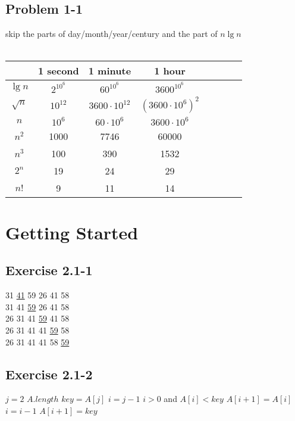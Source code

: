 \documentclass[12pt]{article}
\theoremstyle{definition}
\theoremstyle{remark}
\begin{document}
\subsection*{Problem 1-1}
skip the parts of day/month/year/century and the part of $n\lg{n}$\\
\\
\begin{tabular}{|c|c|c|c|c|c|c|c|}\hline
 & 1 second & 1 minute & 1 hour\\ \hline
$\lg{n}$ & $2^{10^6}$ & $60^{10^6}$ & $3600^{10^6}$\\ \hline
$\sqrt{n}$ & $10^{12}$ & $3600\cdot 10^{12}$ & $(3600\cdot 10^6)^2$\\ \hline
$n$ & $10^6$ & $60\cdot 10^6$ & $3600\cdot 10^6$ \\ \hline
$n^2$ & 1000 & 7746 & 60000 \\ \hline
$n^3$ & 100 & 390 & 1532 \\ \hline
$2^n$ & 19 & 24 & 29 \\ \hline
$n!$ & 9 & 11 & 14 \\ \hline
\end{tabular}
\section{Getting Started}
\subsection*{Exercise 2.1-1}
31 \underline{41} 59 26 41 58\\
31 41 \underline{59} 26 41 58\\
26 31 41 \underline{59} 41 58\\
26 31 41 41 \underline{59} 58\\
26 31 41 41 58 \underline{59}\\
\subsection*{Exercise 2.1-2}
\begin{codebox}
\li \For $j = 2$ \To $A.length$ \label{li:for}
\li \quad $key = A[j]$
\li \quad $i = j - 1$
\li \quad \While $i > 0$ and $A[i] < key$ \label{li:while}
\li \qquad $A[i + 1] = A[i]$
\li \qquad $i = i - 1$
\li \quad $A[i + 1] = key$
\end{codebox}
\end{document}
